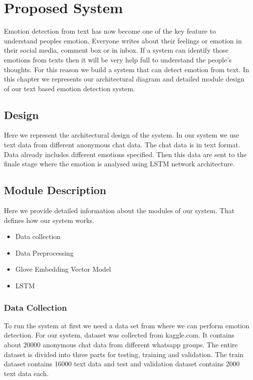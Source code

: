 \chapter{Proposed System}
\label{ch:Proposed System}
Emotion detection from text has now become one of the key feature to understand peoples emotion. Everyone writes about their feelings or emotion in their social media, comment box or in inbox. If a system can identify those emotions from texts then it will be very help full to understand the people's thoughts. For this reason we build a system that can detect emotion from text. In this chapter we represents our architectural diagram and detailed module design of our text based emotion detection system.

\section{Design}
Here we represent the architectural design of the system. In our system we use text data from different anonymous chat data. The chat data is in text format. Data already includes different emotions specified. Then this data are sent to the finale stage where the emotion is analysed using LSTM network architecture.


\section{Module Description}
Here we provide detailed information about the modules of our system. That defines how our system works.
\begin{itemize}
\item Data collection
\item Data Preprocessing
\item Glove Embedding Vector Model
\item LSTM
\end{itemize}

\subsection{Data Collection}
To run the system at first we need a data set from where we can perform emotion detection. For our system, dataset was collected from kaggle.com. It contains about 20000 anonymous chat data from different whatsapp groups. The entire dataset is divided into three parts for testing, training and validation. The train dataset contains 16000 text data and test and validation dataset contains 2000 text data each.

